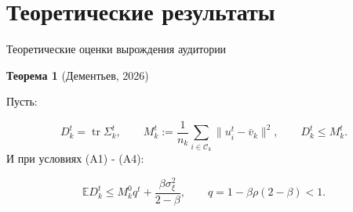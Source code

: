 \documentclass[aspectratio=43]{beamer}
\begin{document}
\section{Теоретические результаты}

\begin{frame}{Теоретические оценки вырождения аудитории}
\footnotesize

\large{\textcolor{myNewColorA}{\textbf{Теорема 1} (Дементьев, 2026)}}\normalsize
\vspace{0.25em}

{\footnotesize Пусть:}



\[
D_k^t=\operatorname{tr}\Sigma_k^t,\qquad
M_k^t:=\frac1{n_k}\sum_{i\in\mathcal C_k}\|u_i^t-\bar v_k\|^2,\qquad
D_k^t\le M_k^t.
\]
{\footnotesize И при условиях (A1) - (A4):}

\vspace{0.2em}
\[
\boxed{\;
\mathbb E D_k^t
\le
M_k^0q^t+\frac{\beta\sigma_\xi^2}{2-\beta},
\qquad
q=1-\beta\rho(2-\beta)<1.
\;}
\]
\end{frame}
\end{document}
